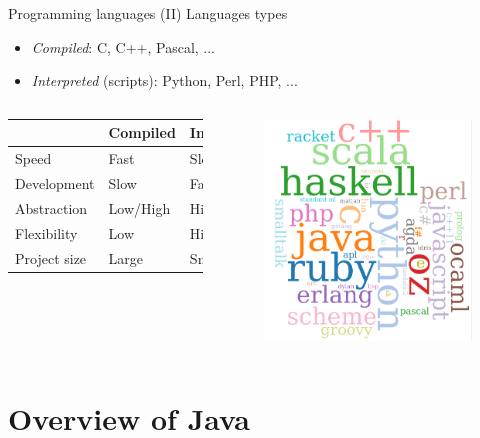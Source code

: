 \documentclass[10pt,compress]{beamer} %
\begin{document}
\begin{frame}{Programming languages (II)}
	Languages types
	\begin{itemize}
		\item \textit{Compiled}: C, C++, Pascal, ...
		\item \textit{Interpreted} (\alert{scripts}): Python, Perl, PHP, ...
 	\end{itemize}

	\begin{columns}
		\begin{tabular}{|l|l|l|}
		\hline
		      		& Compiled 	& Interpreted  \\\hline
		Speed 		& Fast 	 	& Slow 		\\
		Development	& Slow 	 	& Fast 		\\
		Abstraction & Low/High	& High 		\\
		Flexibility & Low		& High 		\\
		Project size& Large		& Small 	\\\hline
		\end{tabular}
		\begin{figure}[t]
		\begin{center}
		    \includegraphics[width=0.7\linewidth]{figs/wordmap.png}
		\end{center}
   	 	\end{figure}
\end{columns}
\end{frame}

\section{Overview of Java}
\end{document}
